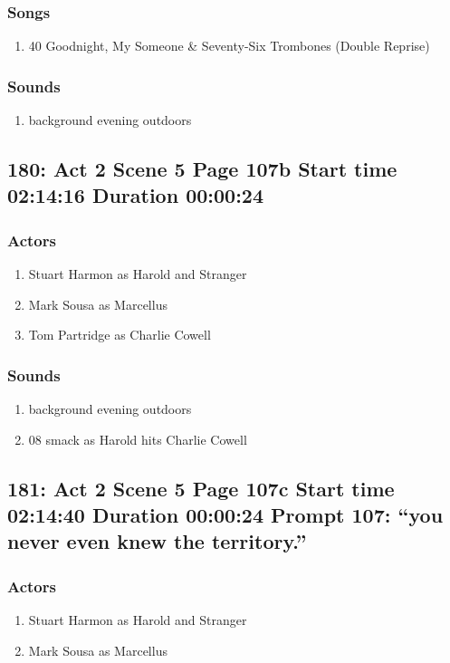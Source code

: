 \subsubsection{Songs}
\begin{enumerate}
\item 40 Goodnight, My Someone \& Seventy-Six Trombones (Double Reprise)
\end{enumerate}\subsubsection{Sounds}
\begin{enumerate}
\item background evening outdoors
\end{enumerate}
\subsection{180: Act 2 Scene 5 Page 107b Start time 02:14:16 Duration 00:00:24}

\subsubsection{Actors}
\begin{enumerate}
\item Stuart Harmon as Harold and Stranger
\item Mark Sousa as Marcellus
\item Tom Partridge as Charlie Cowell
\end{enumerate}

\subsubsection{Sounds}
\begin{enumerate}
\item background evening outdoors
\item 08 smack as Harold hits Charlie Cowell
\end{enumerate}
\subsection{181: Act 2 Scene 5 Page 107c Start time 02:14:40 Duration 00:00:24 Prompt 107: ``you never even knew the territory.''}

\subsubsection{Actors}
\begin{enumerate}
\item Stuart Harmon as Harold and Stranger
\item Mark Sousa as Marcellus
\end{enumerate}

